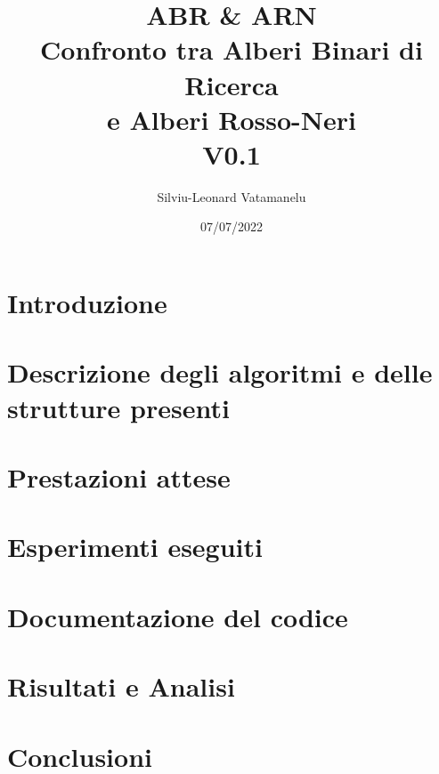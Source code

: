\documentclass[11pt]{article}
\title{%
    ABR \& ARN \\
    \large Confronto tra Alberi Binari di Ricerca \\
    e Alberi Rosso-Neri \\
    \small V0.1}
\author{ Silviu-Leonard Vatamanelu }
\date{07/07/2022}
\begin{document}
\maketitle	
\pagebreak

\tableofcontents
\pagebreak

\section{Introduzione}

\pagebreak

\section{Descrizione degli algoritmi e delle strutture presenti}

\pagebreak

\section{Prestazioni attese}

\pagebreak

\section{Esperimenti eseguiti}

\pagebreak

\section{Documentazione del codice}

\pagebreak

\section{Risultati e Analisi}

\pagebreak

\section{Conclusioni}

\pagebreak
\end{document}
